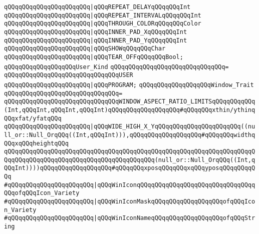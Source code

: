 \verb|qQQqqQQqqQQqqQQqqQQqqQQq|\verb#|qQQqREPEAT_DELAYqQQqqQQqInt#\newline
\verb|qQQqqQQqqQQqqQQqqQQqqQQq|\verb#|qQQqREPEAT_INTERVALqQQqqQQqInt#\newline
\verb|qQQqqQQqqQQqqQQqqQQqqQQq|\verb#|qQQqTHROUGH_COLORqQQqqQQqColor#\newline
\verb|qQQqqQQqqQQqqQQqqQQqqQQq|\verb#|qQQqINNER_PAD_XqQQqqQQqInt#\newline
\verb|qQQqqQQqqQQqqQQqqQQqqQQq|\verb#|qQQqINNER_PAD_YqQQqqQQqInt#\newline
\verb|qQQqqQQqqQQqqQQqqQQqqQQq|\verb#|qQQqSHOWqQQqqQQqChar#\newline
\verb|qQQqqQQqqQQqqQQqqQQqqQQq|\verb#|qQQqTEAR_OFFqQQqqQQqBool;#\newline
\newline
\verb|qQQqqQQqqQQqqQQqqQQqUser_Kind|\newline
\verb|qQQqqQQqqQQqqQQqqQQqqQQqqQQqqQQq=|\newline
\verb|qQQqqQQqqQQqqQQqqQQqqQQqqQQqqQQqUSER|\newline
\verb|qQQqqQQqqQQqqQQqqQQqqQQq|\verb#|qQQqPROGRAM;#\newline
\newline
\verb|qQQqqQQqqQQqqQQqqQQqWindow_Trait|\newline
\verb|qQQqqQQqqQQqqQQqqQQqqQQqqQQqqQQq=|\newline
\verb|qQQqqQQqqQQqqQQqqQQqqQQqqQQqqQQqWINDOW_ASPECT_RATIO_LIMITSqQQqqQQqqQQq(Int,qQQqInt,qQQqInt,qQQqInt)qQQqqQQqqQQqqQQqqQQq#qQQqqQQqxthin/ythinqQQqxfat/yfatqQQq|\newline
\verb|qQQqqQQqqQQqqQQqqQQqqQQq|\verb#|qQQqWIDE_HIGH_X_YqQQqqQQqqQQqqQQqqQQqqQQq((null_or::Null_OrqQQq((Int,qQQqInt))),qQQqqQQqqQQqqQQqqQQq#\verb|#qQQqqQQqwidthqQQqxqQQqheightqQQq|\newline
\verb|qQQqqQQqqQQqqQQqqQQqqQQqqQQqqQQqqQQqqQQqqQQqqQQqqQQqqQQqqQQqqQQqqQQqqQQqqQQqqQQqqQQqqQQqqQQqqQQqqQQqqQQqqQQqqQQq(null_or::Null_OrqQQq((Int,qQQqInt))))qQQqqQQqqQQqqQQqqQQq#qQQqqQQqxposqQQqqQQqxqQQqyposqQQqqQQqqQQq|\newline
\newline
\verb|#qQQqqQQqqQQqqQQqqQQqqQQq|\verb#|qQQqWinIconqQQqqQQqqQQqqQQqqQQqqQQqqQQqqQQqqQQqofqQQqIcon_Variety#\newline
\verb|#qQQqqQQqqQQqqQQqqQQqqQQq|\verb#|qQQqWinIconMaskqQQqqQQqqQQqqQQqqQQqofqQQqIcon_Variety#\newline
\verb|#qQQqqQQqqQQqqQQqqQQqqQQq|\verb#|qQQqWinIconNameqQQqqQQqqQQqqQQqqQQqofqQQqString#\newline
